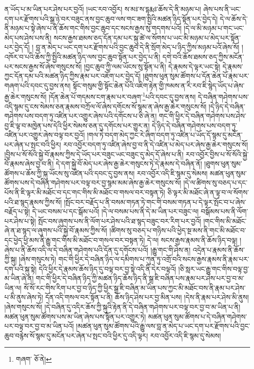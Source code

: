 ན་ཡོད་པ་མ་ཡིན་པར་ཤེས་པར་བྱའོ། །ཡང་རབ་འབྱོར། ས་མཿ་ས་དྷརྨཿ་ཆོས་དེ་ནི་མཉམ་པ། ཞེས་པས་ནི་ཡང་དག་པར་རྫོགས་པའི་སྒྲ་ཉེ་བར་བཟུང་ནས་བྱང་ཆུབ་ལས་གང་ཟག་སྤྱིའི་མཚན་ཉིད་སྟོན་པར་བྱེད་དེ། དེ་ལ་ཆོས་དེ་ནི་མཉམ་པ་སྟེ་ཞེས་པ་ནི་ཆོས་གང་གིས་བྱང་ཆུབ་དང་སངས་རྒྱས་སུ་གདགས་པའོ། །དེ་ལ་མི་མཉམ་པ་གང་ཡང་མེད་པས་ཤེས་པས་ནི། སངས་རྒྱས་ཐམས་ཅད་དོན་དམ་པར་སྐུ་ཚེ་ལ་སོགས་པ་ཡང་མི་མཉམ་པ་མེད་པར་སྟོན་པར་བྱེད་དོ། །
བླ་ན་མེད་པ་ཡང་དག་པར་རྫོགས་པའི་བྱང་ཆུབ་དེ་ནི་སྲོག་མེད་པ་ཉིད་ཀྱིས་མཉམ་པའོ་ཞེས་སོ། །འཁོར་བ་པའི་ཆོས་ཀྱི་སྤྱིའི་མཚན་ཉིད་ལས་བྱང་ཆུབ་སྟོན་པར་བྱེད་པ་ནི། དགེ་བའི་ཆོས་ཐམས་ཅད་ཀྱིས་མངོན་པར་སངས་རྒྱས་སོ་ཞེས་གསུངས་སོ། །བྱང་ཆུབ་ཀྱི་ལམ་ཡོངས་སུ་སྟོན་པ་ནི། དེ་རྣམས་དེ་ལྟར་ཡང་སྟེ། དེ་རྣམས་ཀྱང་དོན་དམ་པའི་མཚན་ཉིད་ཀྱིས་རྣམ་པར་འཇོག་པར་བྱེད་དོ། །ཐུགས་ཕུན་སུམ་ཚོགས་པ་དོན་ཆེན་པོ་རྣམ་པར་གཞག་པའི་དབང་དུ་བྱས་ནས། སྟོང་གསུམ་གྱི་སྟོང་ཆེན་པོའི་འཇིག་རྟེན་གྱི་ཁམས་ན་རི་རབ་ཇི་སྙེད་ཡོད་པ་ཞེས་རྒྱ་ཆེར་གསུངས་སོ། །དོན་ཆེན་པོ་གདམས་ངག་རྣམ་པར་བཞག་\footnote{གཞག་  ཅོ་ནེ། }པའི་དབང་དུ་བྱས་ནས། དེ་བཞིན་གཤེགས་པས་འདི་སྙམ་དུ་ངས་སེམས་ཅན་རྣམས་བཀྲོལ་ལོ་ཞེས་དགོངས་སོ་སྙམ་ན་ཞེས་རྒྱ་ཆེར་གསུངས་སོ། །དེ་ཉིད་དེ་བཞིན་གཤེགས་པས་བདག་ཏུ་འཛིན་པར་འགྱུར་ཞེས་པའི་དགོངས་པ་ཅི་ཞེ་ན། གང་གི་ཕྱིར་དེ་བཞིན་གཤེགས་པས་ཤེས་བྱ་ཇི་ལྟ་བ་མཁྱེན་པས་དེའི་ཕྱིར་སེམས་ཅན་དུ་དགོངས་པར་གྱུར་ན། དེ་ཉིད་དེ་བཞིན་གཤེགས་པས་བདག་ཏུ་འཛིན་པར་འགྱུར་ཞེས་བལྟ་བར་བྱའོ། །གལ་ཏེ་བདག་མེད་ཀྱང་རེ་ཞིག་བདག་ཏུ་འཛིན་པ་ཡོད་དོ་སྙམ་དུ་མངོན་པར་ཞེན་པ་སྤང་བའི་ཕྱིར། རབ་འབྱོར་བདག་ཏུ་འཛིན་ཞེས་བྱ་བ་ནི་དེ་འཛིན་པ་མེད་པར་ཞེས་རྒྱ་ཆེར་གསུངས་སོ། །བྱིས་པ་སོ་སོའི་སྐྱེ་བོ་རྣམས་ཀྱིས་དེ་ཡོད་པར་བཟུང་ཡང་བཟུང་དུ་མེད་དོ་ཞེས་པ་ནི། རབ་འབྱོར་བྱིས་པ་སོ་སོའི་སྐྱེ་བོ་རྣམས་ཞེས་བྱ་བ་ནི། དེ་དག་སྐྱེ་བོ་མེད་པར་ཞེས་རྒྱ་ཆེར་གསུངས་ཏེ་དེ་རྣམས་དེ་བཞིན་ནོ། །ཐུགས་ཕུན་སུམ་ཚོགས་པ་ཆོས་ཀྱི་སྐུ་ཡོངས་སུ་འཛིན་པའི་དབང་དུ་བྱས་ནས། རབ་འབྱོར་འདི་ཇི་སྙམ་དུ་སེམས། མཚན་ཕུན་སུམ་ཚོགས་པས་དེ་བཞིན་གཤེགས་པར་བལྟ་བར་བྱ་སྙམ་མམ་ཞེས་རྒྱ་ཆེར་གསུངས་སོ། །དེ་ལ་ཚིགས་སུ་བཅད་པ་དང་པོས་ནི་ཇི་ལྟར་མི་མཐོང་བ་དང་གང་གིས་མི་མཐོང་བ་གསལ་བར་བསྟན་ཏེ། ཅི་ལྟར་མི་མཐོང་ཞེ་ན་ལྟ་བ་ལ་སོགས་པའི་ཐ་སྙད་རྣམས་ཀྱིས་སོ། །སྤོང་བར་བརྗོད་པ་ནི་བསམ་གཏན་ཏེ་གང་གི་བསམ་གཏན་པ་དེ་ལྟར་སྤོང་བ་པ་ཞེས་བརྗོད་པ་སྟེ། དེ་ཡང་བསམ་པ་དང་སྒོམ་པའོ། །དེ་ལ་བསམ་པས་ནི་དེ་མ་ཡིན་པར་བཟུང་ལ། བསྒོམས་པས་ནི་ལོག་པར་ཤེས་པ་སྟེ། སྤོང་བས་ཞུགས་པས་ནི་ལོག་པར་ཤེས་པའི་ཐ་སྙད་བཟུང་བར་རིག་པར་བྱའོ། །གང་གིས་མི་མཐོང་ཞེ་ན་ཐ་སྙད་ལ་ཞུགས་པའི་སྐྱེ་བོ་རྣམས་ཀྱིས་སོ། །ཚིགས་སུ་བཅད་པ་གཉིས་པའི་ཕྱེད་སྔ་མས་ནི་གང་མི་མཐོང་བ་དང་ཕྱེད་ཕྱི་མས་ནི་རྒྱུ་གང་གིས་མི་མཐོང་བ་གསལ་བར་བསྟན་ཏེ། དེ་ལ། སངས་རྒྱས་རྣམས་ནི་ཆོས་ཉིད་བལྟ། །ཞེས་པ་ནི་ཆོས་འདི་ལ་དེ་བཞིན་གཤེགས་པའི་དོན་དུ་དགོངས་པའོ། །རྒྱུ་གང་གི་ཤེས་ན། འདྲེན་པ་རྣམས་ནི་ཆོས་ཀྱི་སྐུ། །ཞེས་གསུངས་ཏེ། གང་གི་ཕྱིར་དེ་བཞིན་ཉིད་ལ་དམིགས་པ་ཀུན་ཏུ་འགྲོ་བའི་སངས་རྒྱས་རྣམས་ནི་རྣམ་པར་དག་པའི་སྐུ་སྟེ། དེའི་ཕྱིར་དེ་རྣམས་ཆོས་ཉིད་དུ་བལྟ་བར་བྱ་སྟེ་འདི་ནི་དེར་བལྟའོ། །ཅི་སླར་ཡང་རྒྱུ་གང་གིས་བལྟ་བྱ་མ་ཡིན་ཞེ་ན། གང་གི་ཕྱིར་དེ་བཞིན་ཉིད་ཀྱི་མཚན་ཉིད་ཆོས་ཉིད་ནི་སྒྲ་ཇི་བཞིན་པས་རྣམ་པར་ཤེས་པར་བྱ་བ་མ་ཡིན་ལ། སོ་སོ་རང་གིས་རིག་པར་བྱ་བ་ཉིད་ཀྱི་ཕྱིར་སྒྲ་ཇི་བཞིན་མ་ཡིན་པས་ཀྱང་མི་མཐོང་བས་ནི་རྣམ་པར་ཤེས་པ་མི་ནུས་ཞེས་ཏེ། དོན་འདི་གསལ་བར་སྟོན་པ་ནི། ཆོས་ཉིད་ཤེས་པར་བྱ་མིན་པས། །དེས་ནི་རྣམ་པར་ཤེས་མི་ནུས། །ཞེས་གསུངས་སོ། །དེ་བཞིན་དུ་འདིར་ཆོས་ཀྱི་སྐུའི་རྟེན་ནི་དེ་བཞིན་གཤེགས་པར་བལྟ་བར་བྱ་བ་མ་ཡིན་པ་ནི། མཚན་ཕུན་སུམ་ཚོགས་པས་མ་ཡིན་ཞེས་པས་སྟོན་པར་འགྱུར་ཏེ། མཚན་ཕུན་སུམ་ཚོགས་པ་དེ་བཞིན་གཤེགས་པར་བལྟ་བར་བྱ་བ་མ་ཡིན་པའོ། །མཚན་ཕུན་སུམ་ཚོགས་པའི་རྒྱུ་ལས་བླ་ན་མེད་པ་ཡང་དག་པར་རྫོགས་པའི་བྱང་ཆུབ་བརྙེས་སོ་སྙམ་དུ་མངོན་པར་ཞེན་པ་སྤང་བའི་ཕྱིར་དུ་འདི་ལྟར། རབ་འབྱོར་འདི་ཇི་སྙམ་དུ་སེམས། 